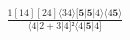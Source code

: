 \documentclass[varwidth, border=5pt]{standalone}
\begin{document}
\begin{my}
$\begin{gathered}
\scriptscriptstyle\frac{1[14][24]⟨34⟩[𝟓|𝟓|4⟩⟨4𝟓⟩}{⟨4|2+3|4]²⟨4|𝟓|4]}
\end{gathered}$
\end{my}
\end{document}
